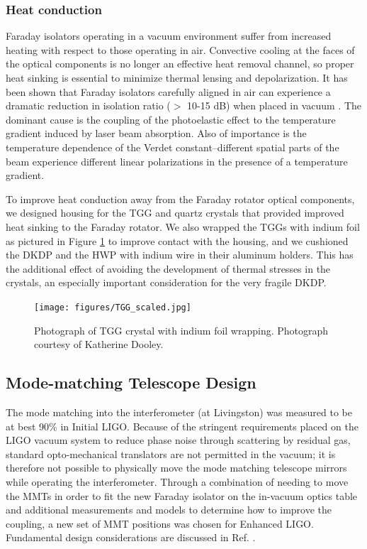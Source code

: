 \subsubsection{Heat conduction}
\label{sec:heatconduction}
Faraday isolators operating in a vacuum environment suffer from
increased heating with respect to those operating in air. Convective
cooling at the faces of the optical components is no longer an
effective heat removal channel, so proper heat sinking is essential to
minimize thermal lensing and depolarization. It has been shown that
Faraday isolators carefully aligned in air can experience a dramatic
reduction in isolation ratio ($>$ 10-15 dB) when placed in vacuum
\citep{TheVIRGOCollaboration2008Invacuum}. The dominant cause is the
coupling of the photoelastic effect to the temperature gradient
induced by laser beam absorption. Also of importance is the
temperature dependence of the Verdet constant--different spatial parts
of the beam experience different linear polarizations in the presence
of a temperature gradient.

To improve heat conduction away from the Faraday rotator optical
components, we designed housing for the TGG and quartz crystals that
provided improved heat sinking to the Faraday rotator. We also wrapped
the TGGs with indium foil as pictured in Figure \ref{fig:TGG} to improve
contact with the housing, and we cushioned the DKDP and the HWP with
indium wire in their aluminum holders. This has the additional effect
of avoiding the development of thermal stresses in the crystals, an
especially important consideration for the very fragile DKDP.

\begin{figure}
\begin{centering}
\texttt{[image: figures/TGG\_scaled.jpg]}
\caption[Photograph of an indium-wrapped TGG crystal]{Photograph of TGG crystal
  with indium foil wrapping. Photograph courtesy of Katherine Dooley.}
\label{fig:TGG}
\end{centering}
\end{figure}


\subsection{Mode-matching Telescope Design}
The mode matching into the interferometer (at Livingston) was measured
to be at best 90\% in Initial LIGO. Because of the stringent
requirements placed on the LIGO vacuum system to reduce phase noise
through scattering by residual gas, standard opto-mechanical
translators are not permitted in the vacuum; it is therefore not
possible to physically move the mode matching telescope mirrors while
operating the interferometer. Through a combination of needing to move
the MMTs in order to fit the new Faraday isolator on the in-vacuum
optics table and additional measurements and models to determine how
to improve the coupling, a new set of MMT positions was chosen for
Enhanced LIGO. Fundamental design considerations are discussed in
Ref. \citep{Delker1997Design}.



